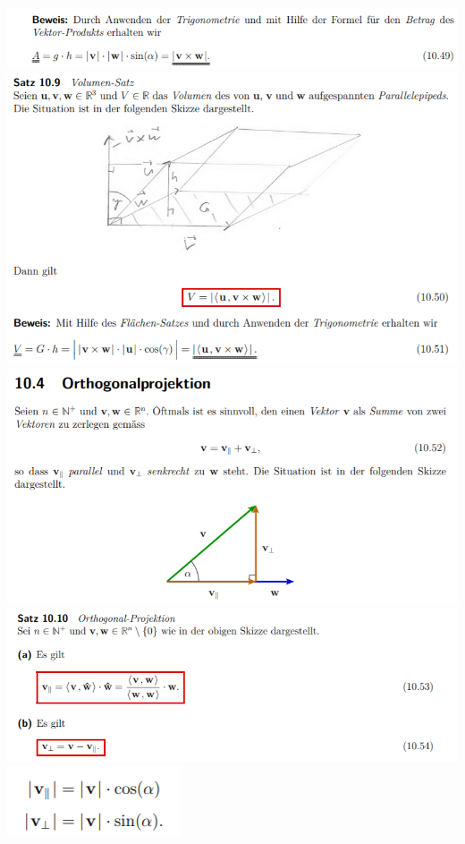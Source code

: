 \includegraphics[width=\columnwidth]{./images/vek18.png}
\includegraphics[width=\columnwidth]{./images/vek19.png}
\includegraphics[width=\columnwidth]{./images/vek20.png}
\includegraphics[width=\columnwidth]{./images/vek21.png}
\includegraphics[width=\columnwidth]{./images/vek22.png}
